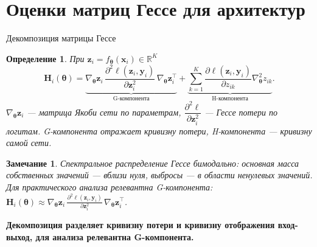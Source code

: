 \documentclass[9pt,pdf,hyperref={unicode}]{beamer}
\newtheorem{rusdefinition}{Определение}
\newtheorem{rusremark}{Замечание}
\newcommand{\key}[1]{\par\vspace{0.5ex}\noindent\textbf{\color{darkgreen}#1}}
\begin{document}
\section{Оценки матриц Гессе для архитектур}
\begin{frame}{Декомпозиция матрицы Гессе}
\justifying
\small
\begin{rusdefinition}
    При $\mathbf{z}_i=f_{\boldsymbol{\theta}}(\mathbf{x}_i)\in\mathbb{R}^{K}$
    \[
        \mathbf{H}_i(\boldsymbol{\theta})=\underbrace{\nabla_{\boldsymbol{\theta}}\mathbf{z}_i\,\frac{\partial^2\ell(\mathbf{z}_i,\mathbf{y}_i)}{\partial\mathbf{z}_i^2}\,\nabla_{\boldsymbol{\theta}}\mathbf{z}_i^{\top}}_{\text{G-компонента}}+\underbrace{\sum_{k=1}^{K}\frac{\partial\ell(\mathbf{z}_i,\mathbf{y}_i)}{\partial z_{ik}}\nabla^2_{\boldsymbol{\theta}}z_{ik}}_{\text{H-компонента}}.
    \]
    $\nabla_{\boldsymbol{\theta}}\mathbf{z}_i$ --- матрица Якоби сети по параметрам, $\dfrac{\partial^2\ell}{\partial\mathbf{z}_i^2}$ --- Гессе потери по логитам. G-компонента отражает кривизну потери, H-компонента --- кривизну самой сети.
\end{rusdefinition}
\begin{rusremark}
    Спектральное распределение Гессе бимодально: основная масса собственных значений --- вблизи нуля, выбросы --- в области ненулевых значений. Для практического анализа релевантна G-компонента:
    $\mathbf{H}_{i}(\boldsymbol{\theta})\approx\nabla_{\boldsymbol{\theta}}\mathbf{z}_i\,\frac{\partial^2\ell(\mathbf{z}_i,\mathbf{y}_i)}{\partial\mathbf{z}_i^2}\,\nabla_{\boldsymbol{\theta}}\mathbf{z}_i^{\top}$.
\end{rusremark}
\key{Декомпозиция разделяет кривизну потери и кривизну отображения вход-выход, для анализа релевантна G-компонента.}
\end{frame}
\end{document}
